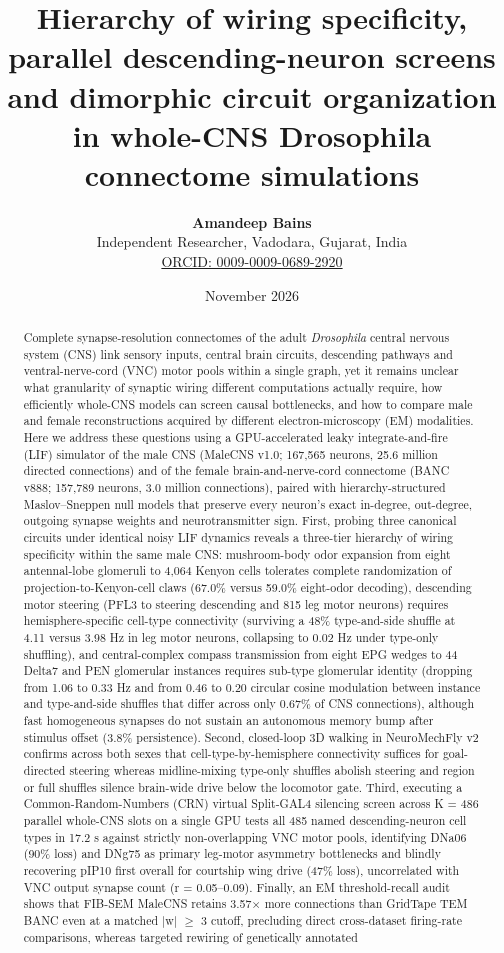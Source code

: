 \documentclass[11pt,a4paper]{article}
\title{Hierarchy of wiring specificity, parallel descending-neuron screens and dimorphic circuit organization in whole-CNS Drosophila connectome simulations}
\author{\textbf{Amandeep Bains} \\ \small Independent Researcher, Vadodara, Gujarat, India \\ \small \href{https://orcid.org/0009-0009-0689-2920}{ORCID: 0009-0009-0689-2920}}
\date{November 2026}
\begin{document}
\maketitle

\begin{abstract}
Complete synapse-resolution connectomes of the adult \emph{Drosophila} central nervous system (CNS) link sensory inputs, central brain circuits, descending pathways and ventral-nerve-cord (VNC) motor pools within a single graph, yet it remains unclear what granularity of synaptic wiring different computations actually require, how efficiently whole-CNS models can screen causal bottlenecks, and how to compare male and female reconstructions acquired by different electron-microscopy (EM) modalities. Here we address these questions using a GPU-accelerated leaky integrate-and-fire (LIF) simulator of the male CNS (MaleCNS v1.0; 167,565 neurons, 25.6 million directed connections) and of the female brain-and-nerve-cord connectome (BANC v888; 157,789 neurons, 3.0 million connections), paired with hierarchy-structured Maslov--Sneppen null models that preserve every neuron's exact in-degree, out-degree, outgoing synapse weights and neurotransmitter sign. First, probing three canonical circuits under identical noisy LIF dynamics reveals a three-tier hierarchy of wiring specificity within the same male CNS: mushroom-body odor expansion from eight antennal-lobe glomeruli to 4,064 Kenyon cells tolerates complete randomization of projection-to-Kenyon-cell claws (67.0\% versus 59.0\% eight-odor decoding), descending motor steering (PFL3 to steering descending and 815 leg motor neurons) requires hemisphere-specific cell-type connectivity (surviving a 48\% type-and-side shuffle at 4.11 versus 3.98 Hz in leg motor neurons, collapsing to 0.02 Hz under type-only shuffling), and central-complex compass transmission from eight EPG wedges to 44 Delta7 and PEN glomerular instances requires sub-type glomerular identity (dropping from 1.06 to 0.33 Hz and from 0.46 to 0.20 circular cosine modulation between instance and type-and-side shuffles that differ across only 0.67\% of CNS connections), although fast homogeneous synapses do not sustain an autonomous memory bump after stimulus offset (3.8\% persistence). Second, closed-loop 3D walking in NeuroMechFly v2 confirms across both sexes that cell-type-by-hemisphere connectivity suffices for goal-directed steering whereas midline-mixing type-only shuffles abolish steering and region or full shuffles silence brain-wide drive below the locomotor gate. Third, executing a Common-Random-Numbers (CRN) virtual Split-GAL4 silencing screen across K = 486 parallel whole-CNS slots on a single GPU tests all 485 named descending-neuron cell types in 17.2 s against strictly non-overlapping VNC motor pools, identifying DNa06 (90\% loss) and DNg75 as primary leg-motor asymmetry bottlenecks and blindly recovering pIP10 first overall for courtship wing drive (47\% loss), uncorrelated with VNC output synapse count (r = 0.05--0.09). Finally, an EM threshold-recall audit shows that FIB-SEM MaleCNS retains 3.57$\times$ more connections than GridTape TEM BANC even at a matched |w| $\geq$ 3 cutoff, precluding direct cross-dataset firing-rate comparisons, whereas targeted rewiring of genetically annotated 
\end{abstract}
\end{document}
